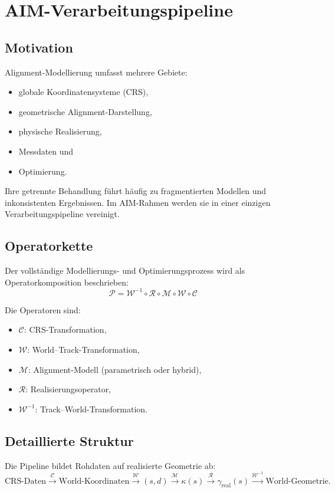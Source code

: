 \section{AIM-Verarbeitungspipeline}
\subsection*{Motivation}
Alignment-Modellierung umfasst mehrere Gebiete:
\begin{itemize}
\item globale Koordinatensysteme (CRS),
\item geometrische Alignment-Darstellung,
\item physische Realisierung,
\item Messdaten und
\item Optimierung.
\end{itemize}
Ihre getrennte Behandlung führt häufig zu fragmentierten Modellen und
inkonsistenten Ergebnissen. Im AIM-Rahmen werden sie in einer einzigen
Verarbeitungspipeline vereinigt.

\subsection{Operatorkette}
\begin{definition}
Der vollständige Modellierungs- und Optimierungsprozess wird als
Operatorkomposition beschrieben:
\[
\boxed{\mathcal P=\mathcal W^{-1}\circ\mathcal R\circ\mathcal M\circ\mathcal W\circ\mathcal C}
\]
\end{definition}
Die Operatoren sind:
\begin{itemize}
\item \(\mathcal C\): CRS-Transformation,
\item \(\mathcal W\): World--Track-Transformation,
\item \(\mathcal M\): Alignment-Modell (parametrisch oder hybrid),
\item \(\mathcal R\): Realisierungsoperator,
\item \(\mathcal W^{-1}\): Track--World-Transformation.
\end{itemize}

\subsection{Detaillierte Struktur}
Die Pipeline bildet Rohdaten auf realisierte Geometrie ab:
\[
\text{CRS-Daten}\xrightarrow{\mathcal C}\text{World-Koordinaten}
\xrightarrow{\mathcal W}(s,d)\xrightarrow{\mathcal M}\kappa(s)
\xrightarrow{\mathcal R}\gamma_{\mathrm{real}}(s)
\xrightarrow{\mathcal W^{-1}}\text{World-Geometrie}.
\]

